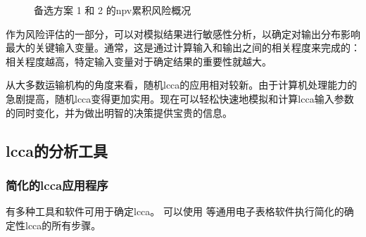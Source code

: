 \begin{figure}
  \caption{备选方案 1 和 2 的\acrlong*{npv}累积风险概况}
  \label{fig:risk-profile}
\end{figure}

作为风险评估的一部分，可以对模拟结果进行敏感性分析，以确定对输出分布影响最大的关键输入变量。通常，这是通过计算输入和输出之间的相关程度来完成的：相关程度越高，特定输入变量对于确定结果的重要性就越大。

从大多数运输机构的角度来看，随机\acrlong*{lcca}的应用相对较新。由于计算机处理能力的急剧提高，随机\acrlong*{lcca}变得更加实用。现在可以轻松快速地模拟和计算\acrlong*{lcca}输入参数的同时变化，并为做出明智的决策提供宝贵的信息。


\subsection{\texorpdfstring{\acrlong*{lcca}}{全生命周期成本分析}的分析工具}
\subsubsection{简化的\acrlong*{lcca}应用程序}
有多种工具和软件可用于确定\acrlong*{lcca}。 可以使用 \Microsoft[\Excel] 等通用电子表格软件执行简化的确定性\acrlong*{lcca}的所有步骤。

